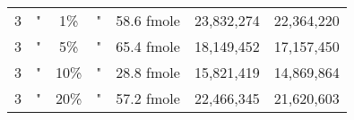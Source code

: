 \begin{table}[htdp]
\begin{center}
\begin{tabular}{|c|c|c|c|c|c|c|}
3 & " & 1\% & " & 58.6 fmole & 23,832,274 &22,364,220 \\
3 & " & 5\% & " & 65.4 fmole & 18,149,452 &17,157,450 \\
3 & " & 10\% & " & 28.8 fmole & 15,821,419 &14,869,864 \\
3 & " & 20\% & " & 57.2 fmole & 22,466,345 &21,620,603 \\
\hline

\end{tabular}
\label{tab:protocols}
\end{center}
\end{table}
      
